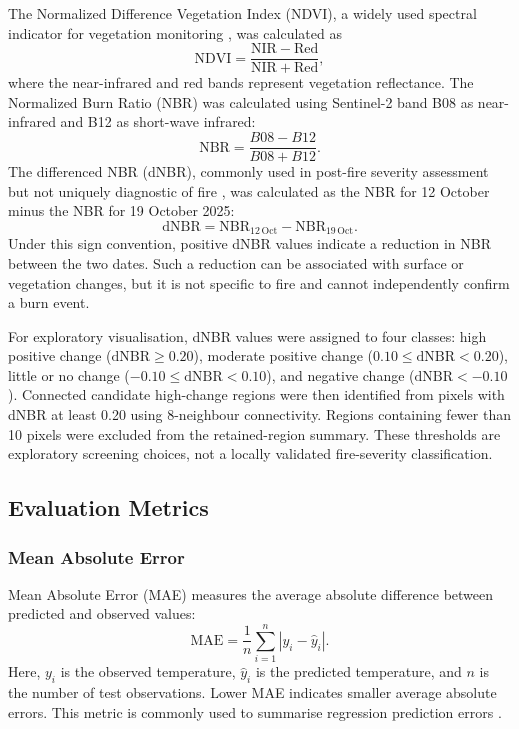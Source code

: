 \documentclass[12pt,a4paper]{article}
\begin{document}
	The Normalized Difference Vegetation Index (NDVI), a widely used spectral
	indicator for vegetation monitoring \cite{tucker1979}, was calculated as
	\begin{equation}
		\mathrm{NDVI}=\frac{\mathrm{NIR}-\mathrm{Red}}
		{\mathrm{NIR}+\mathrm{Red}},
	\end{equation}
	where the near-infrared and red bands represent vegetation reflectance.
	The Normalized Burn Ratio (NBR) was calculated using Sentinel-2 band
	B08 as near-infrared and B12 as short-wave infrared:
	\begin{equation}
		\mathrm{NBR}=\frac{B08-B12}{B08+B12}.
	\end{equation}
	The differenced NBR (dNBR), commonly used in post-fire severity
	assessment but not uniquely diagnostic of fire \cite{keybenson2006}, was calculated as the NBR for
	12 October minus the NBR for 19 October 2025:
	\begin{equation}
		\mathrm{dNBR}=\mathrm{NBR}_{12\,\mathrm{Oct}}
		-\mathrm{NBR}_{19\,\mathrm{Oct}}.
	\end{equation}
	Under this sign convention, positive dNBR values indicate a reduction
	in NBR between the two dates. Such a reduction can be associated with
	surface or vegetation changes, but it is not specific to fire and
	cannot independently confirm a burn event.
	
	For exploratory visualisation, dNBR values were assigned to four
	classes: high positive change ($\mathrm{dNBR}\geq0.20$), moderate
	positive change ($0.10\leq\mathrm{dNBR}<0.20$), little or no change
	($-0.10\leq\mathrm{dNBR}<0.10$), and negative change
	($\mathrm{dNBR}<-0.10$). Connected candidate high-change regions were
	then identified from pixels with dNBR at least 0.20 using 8-neighbour
	connectivity. Regions containing fewer than 10 pixels were excluded
	from the retained-region summary. These thresholds are exploratory
	screening choices, not a locally validated fire-severity classification.
	
	\subsection{Evaluation Metrics}
	
	\subsubsection{Mean Absolute Error}
	
	Mean Absolute Error (MAE) measures the average absolute difference
	between predicted and observed values:
	\begin{equation}
		\mathrm{MAE}=\frac{1}{n}\sum_{i=1}^{n}|y_i-\widehat{y}_i|.
	\end{equation}
	Here, $y_i$ is the observed temperature, $\widehat{y}_i$ is the
	predicted temperature, and $n$ is the number of test observations.
	Lower MAE indicates smaller average absolute errors. This metric is
	commonly used to summarise regression prediction errors \cite{scikitlearnmetrics}.
	
\end{document}
